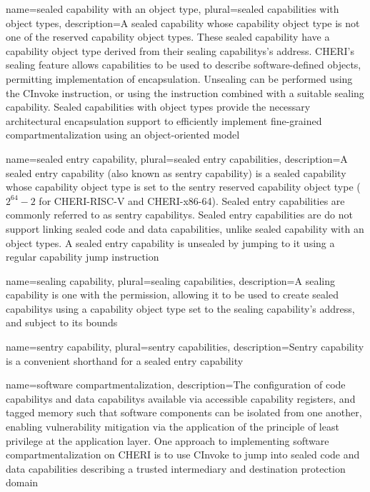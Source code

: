 {
  name=sealed capability with an object type,
  plural=sealed capabilities with object types,
  description={A \gls{sealed capability} whose \gls{capability object type}
    is not one of the \glspl{reserved capability object type}.
    These sealed capability have a \gls{capability object type} derived
    from their \glspl{sealing capability}'s \gls{address}.
    CHERI's sealing feature allows capabilities to be used to describe
    software-defined objects, permitting implementation of encapsulation.
    Unsealing can be performed using the \gls{CInvoke} instruction, or
    using the  instruction combined with a suitable
    \gls{sealing capability}.
    Sealed capabilities with object types provide the necessary architectural
    encapsulation support to efficiently implement fine-grained
    compartmentalization using an object-oriented model}
}

{
  name=sealed entry capability,
  plural=sealed entry capabilities,
  description={A sealed entry \gls{capability} (also known as
    \gls{sentry capability}) is a \gls{sealed capability}
    whose \gls{capability object type} is set to the sentry \gls{reserved capability object type} ($2^{64}-2$ for \gls{CHERI-RISC-V} and \gls{CHERI-x86-64}).
    Sealed entry capabilities are commonly referred to as \glspl{sentry
    capability}.
    Sealed entry capabilities are do not support linking sealed code and
    data capabilities, unlike \glspl{sealed capability with an object type}.
    A sealed entry capability is unsealed by jumping to it using a regular
    capability jump instruction}
}

{
  name=sealing capability,
  plural=sealing capabilities,
  description={A sealing capability is one with the \cappermSeal
    permission, allowing it to be used to create \glspl{sealed capability}
    using a \gls{capability object type} set to the sealing capability's
    \gls{address}, and subject to its bounds}
}

{
  name=sentry capability,
  plural=sentry capabilities,
  description={Sentry capability is a convenient shorthand for a
    \gls{sealed entry capability}}
}

{
  name=software compartmentalization,
  description={The configuration of \glspl{code capability} and \glspl{data
    capability} available via accessible \glspl{capability
    register}, and \gls{tagged memory} such that software components can be
    isolated from one another, enabling \gls{vulnerability mitigation} via the
    application of the \gls{principle of least privilege} at the application
    layer.
    One approach to implementing software compartmentalization on CHERI is to
    use \gls{CInvoke} to jump into sealed code
    and data capabilities describing a trusted intermediary and destination
    protection domain}
}

